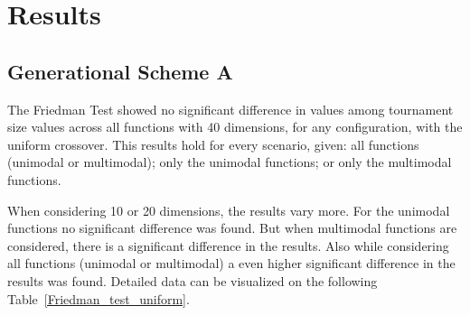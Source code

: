 \section{Results}\label{sec:results}

\subsection{Generational Scheme A}
The Friedman Test showed no significant difference in values among tournament size values across all functions with 40 dimensions, for any configuration, with the uniform crossover. This results hold for every scenario, given: all functions (unimodal or multimodal); only the unimodal functions; or only the multimodal functions. 

When considering 10 or 20 dimensions, the results vary more. For the unimodal functions no significant difference was found. But when multimodal functions are considered, there is a significant difference in the results. Also while considering all functions (unimodal or multimodal) a even higher significant difference in the results was found. Detailed data can be visualized on the following Table~\ref{Friedman_test_uniform}. 



